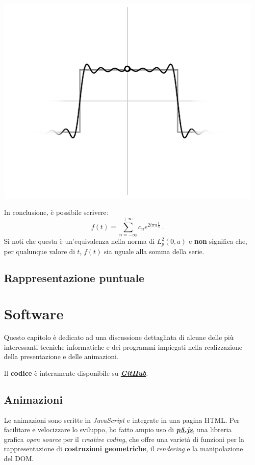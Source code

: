 \documentclass[
]{book}
\begin{document}
\begin{center}\includegraphics[width=0.5\linewidth]{_images/approx} \end{center}

In conclusione, è possibile scrivere:
\[ f(t) = \sum_{n= - \infty}^{+ \infty} c_n e^{2 i \pi n \textstyle \frac {t}{a}} \ .\]
Si noti che questa è un'equivalenza nella norma di \(L_{p}^{2}(0,a)\) e \textbf{non} significa che, per qualunque valore di \(t\), \(f(t)\) sia uguale alla somma della serie.

\hypertarget{rapprpunt}{%
\section{Rappresentazione puntuale}\label{rapprpunt}}

\hypertarget{software}{%
\chapter{Software}\label{software}}

Questo capitolo è dedicato ad una discussione dettagliata di alcune delle più interessanti tecniche informatiche e dei programmi impiegati nella realizzazione della presentazione e delle animazioni.

Il \textbf{codice} è interamente disponibile su \href{https://github.com/Bradwave/thesis}{\emph{\textbf{GitHub}}}.

\hypertarget{softan}{%
\section{Animazioni}\label{softan}}

Le animazioni sono scritte in \emph{JavaScript} e integrate in una pagina HTML. Per facilitare e velocizzare lo sviluppo, ho fatto ampio uso di \href{https://p5js.org/}{\emph{\textbf{p5.js}}}, una libreria grafica \emph{open source} per il \emph{creative coding}, che offre una varietà di funzioni per la rappresentazione di \textbf{costruzioni geometriche}, il \emph{rendering} e la manipolazione del DOM.
\end{document}
